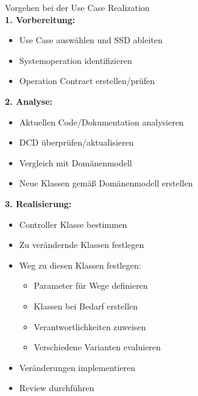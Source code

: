 \begin{KR}{Vorgehen bei der Use Case Realization}\\
\textbf{1. Vorbereitung:}
\begin{itemize}
    \item Use Case auswählen und SSD ableiten
    \item Systemoperation identifizieren
    \item Operation Contract erstellen/prüfen
\end{itemize}

\textbf{2. Analyse:}
\begin{itemize}
    \item Aktuellen Code/Dokumentation analysieren
    \item DCD überprüfen/aktualisieren
    \item Vergleich mit Domänenmodell
    \item Neue Klassen gemäß Domänenmodell erstellen
\end{itemize}

\textbf{3. Realisierung:}
\begin{itemize}
    \item Controller Klasse bestimmen
    \item Zu verändernde Klassen festlegen
    \item Weg zu diesen Klassen festlegen:
    \begin{itemize}
        \item Parameter für Wege definieren
        \item Klassen bei Bedarf erstellen
        \item Verantwortlichkeiten zuweisen
        \item Verschiedene Varianten evaluieren
    \end{itemize}
    \item Veränderungen implementieren
    \item Review durchführen
\end{itemize}
\end{KR}

